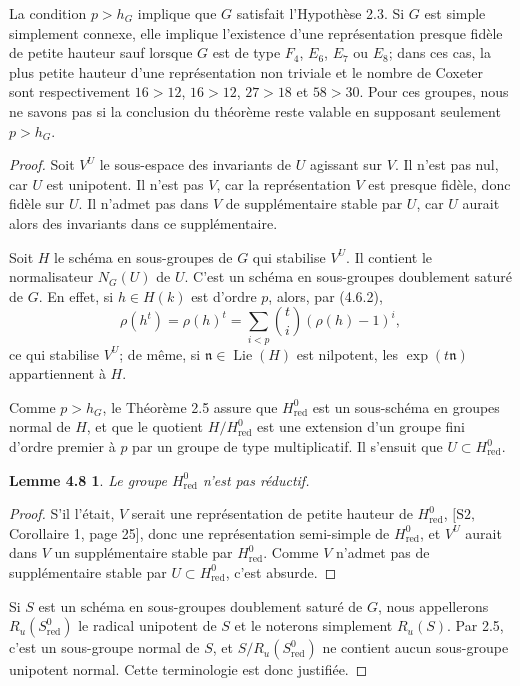 \documentclass[11pt]{article}
\newcommand{\Lie}{\operatorname{Lie}}
\newcommand{\red}{\mathrm{red}}
\newtheorem*{lemme48}{Lemme 4.8}
\begin{document}
La condition \(p>h_G\) implique que \(G\) satisfait l'Hypothèse 2.3. Si \(G\) est simple
simplement connexe, elle implique l'existence d'une représentation presque fidèle de
petite hauteur sauf lorsque \(G\) est de type \(F_4\), \(E_6\), \(E_7\) ou \(E_8\); dans
ces cas, la plus petite hauteur d'une représentation non triviale et le nombre de Coxeter
sont respectivement \(16>12\), \(16>12\), \(27>18\) et \(58>30\). Pour ces groupes, nous
ne savons pas si la conclusion du théorème reste valable en supposant seulement
\(p>h_G\).

\begin{proof}
Soit \(V^U\) le sous-espace des invariants de \(U\) agissant sur \(V\). Il n'est pas nul,
car \(U\) est unipotent. Il n'est pas \(V\), car la représentation \(V\) est presque
fidèle, donc fidèle sur \(U\). Il n'admet pas dans \(V\) de supplémentaire stable par
\(U\), car \(U\) aurait alors des invariants dans ce supplémentaire.

Soit \(H\) le schéma en sous-groupes de \(G\) qui stabilise \(V^U\). Il contient le
normalisateur \(N_G(U)\) de \(U\). C'est un schéma en sous-groupes doublement saturé de
\(G\). En effet, si \(h\in H(k)\) est d'ordre \(p\), alors, par (4.6.2),
\[
  \rho(h^t)=\rho(h)^t=
  \sum_{i<p}\binom{t}{i}(\rho(h)-1)^i,
\]
ce qui stabilise \(V^U\); de même, si \(\mathfrak n\in\Lie(H)\) est nilpotent, les
\(\exp(t\mathfrak n)\) appartiennent à \(H\).

Comme \(p>h_G\), le Théorème 2.5 assure que \(H^0_{\red}\) est un sous-schéma en
groupes normal de \(H\), et que le quotient \(H/H^0_{\red}\) est une extension d'un
groupe fini d'ordre premier à \(p\) par un groupe de type multiplicatif. Il s'ensuit que
\(U\subset H^0_{\red}\).

\begin{lemme48}
Le groupe \(H^0_{\red}\) n'est pas réductif.
\end{lemme48}

\begin{proof}
S'il l'était, \(V\) serait une représentation de petite hauteur de \(H^0_{\red}\),
\([\mathrm{S2},\) Corollaire 1, page 25], donc une représentation semi-simple de
\(H^0_{\red}\), et \(V^U\) aurait dans \(V\) un supplémentaire stable par
\(H^0_{\red}\). Comme \(V\) n'admet pas de supplémentaire stable par
\(U\subset H^0_{\red}\), c'est absurde.
\end{proof}

Si \(S\) est un schéma en sous-groupes doublement saturé de \(G\), nous appellerons
\(R_u(S^0_{\red})\) le radical unipotent de \(S\) et le noterons simplement \(R_u(S)\).
Par 2.5, c'est un sous-groupe normal de \(S\), et \(S/R_u(S^0_{\red})\) ne contient
aucun sous-groupe unipotent normal. Cette terminologie est donc justifiée.


\end{proof}
\end{document}
